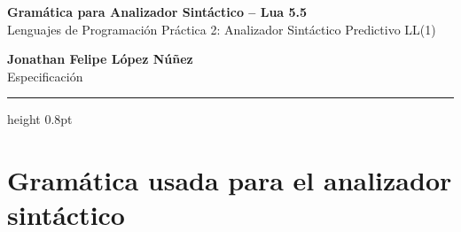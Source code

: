 \documentclass[10pt,letterpaper]{article}
\begin{document}
\pagestyle{plain}

\noindent
\begin{minipage}[t]{0.70\textwidth}
  {\Large \textbf{Gramática para Analizador Sintáctico -- Lua 5.5}} \\
  \footnotesize Lenguajes de Programación \textbullet{} Práctica 2: Analizador Sintáctico Predictivo LL(1)
\end{minipage}%
\hfill
\begin{minipage}[t]{0.28\textwidth}
  \raggedleft
  \normalsize \textbf{Jonathan Felipe López Núñez} \\
  \footnotesize Especificación
\end{minipage}

\vspace{3pt}
\hrule height 0.8pt
\vspace{6pt}

\section{Gramática usada para el analizador sintáctico}
\end{document}
